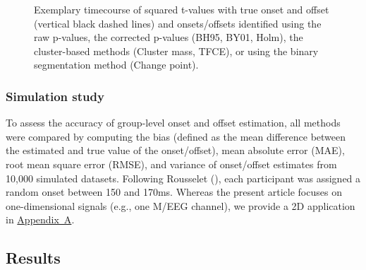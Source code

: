 \documentclass[
  doc,
  floatsintext,
  longtable,
  a4paper,
  nolmodern,
  notxfonts,
  notimes,
  colorlinks=true,linkcolor=blue,citecolor=blue,urlcolor=blue]{apa7}
\begin{document}
\begin{figure}[!htb]

\caption{\label{fig-corrections}Exemplary timecourse of squared t-values
with true onset and offset (vertical black dashed lines) and
onsets/offsets identified using the raw p-values, the corrected p-values
(BH95, BY01, Holm), the cluster-based methods (Cluster mass, TFCE), or
using the binary segmentation method (Change point).}


\end{figure}%

\subsubsection{Simulation study}\label{simulation-study}

To assess the accuracy of group-level onset and offset estimation, all
methods were compared by computing the bias (defined as the mean
difference between the estimated and true value of the onset/offset),
mean absolute error (MAE), root mean square error (RMSE), and variance
of onset/offset estimates from 10,000 simulated datasets. Following
Rousselet (), each participant
was assigned a random onset between 150 and 170ms. Whereas the present
article focuses on one-dimensional signals (e.g., one M/EEG channel), we
provide a 2D application in \hyperref[apx-2D]{Appendix~A}.

\subsection{Results}\label{results}
\end{document}

